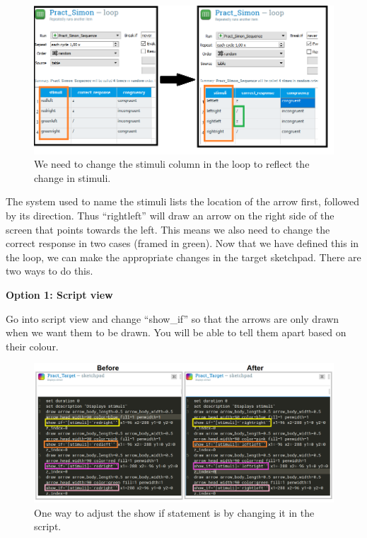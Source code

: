 \documentclass[
]{book}
\begin{document}
\begin{figure}

{\centering \includegraphics[width=0.99\linewidth]{images/changesimon/06Loop} 

}

\caption{We need to change the stimuli column in the loop to reflect the change in stimuli.}\label{fig:Figure3-12}
\end{figure}

The system used to name the stimuli lists the location of the arrow first, followed by its direction. Thus ``rightleft'' will draw an arrow on the right side of the screen that points towards the left. This means we also need to change the correct response in two cases (framed in green). Now that we have defined this in the loop, we can make the appropriate changes in the target sketchpad. There are two ways to do this.

\textbf{Option 1: Script view}

Go into script view and change ``show\_if'' so that the arrows are only drawn when we want them to be drawn. You will be able to tell them apart based on their colour.

\begin{figure}

{\centering \includegraphics[width=0.99\linewidth]{images/changesimon/07script} 

}

\caption{One way to adjust the show if statement is by changing it in the script.}\label{fig:Figure3-13}
\end{figure}
\end{document}
